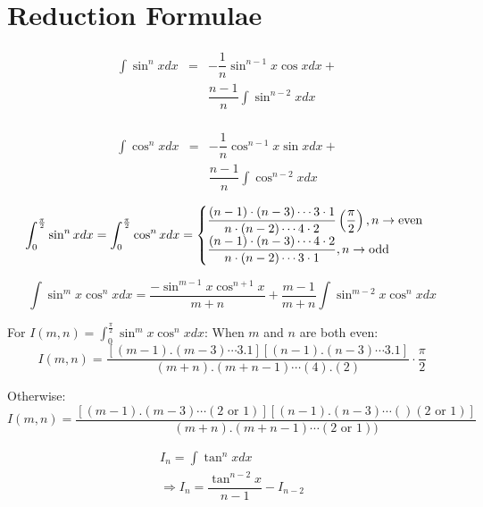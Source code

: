 \chapter{Reduction Formulae}
\begin{equation}
	\begin{aligned}
			\int \sin^n x dx &=&-\dfrac{1}{n}\sin^{n-1} x\cos x dx+&\\
			& &\dfrac{n-1}{n}\int \sin^{n-2} x dx\\
	\end{aligned}
\end{equation}

\begin{equation}
	\begin{aligned}
			\int \cos^n x dx&=&-\dfrac{1}{n}\cos^{n-1} x\sin x dx+&\\
			& &\dfrac{n-1}{n}\int \cos^{n-2} x dx\\
	\end{aligned}
\end{equation}
\begin{equation}
	\int_0^{\frac{\pi}{2}} \sin^n x dx=\int_0^{\frac{\pi}{2}} \cos^n x dx=\begin{cases}\dfrac{(n-1)\cdot(n-3)\cdots 3\cdot1}{n\cdot(n-2)\cdots 4\cdot 2}\left(\dfrac{\pi}{2}\right), n\rightarrow \text{even}\\
		\dfrac{(n-1)\cdot(n-3)\cdots 4\cdot2}{n\cdot(n-2)\cdots 3\cdot 1}, n\rightarrow \text{odd} \end{cases}\\
\end{equation}

\begin{equation}
	\int \sin^m x\cos^n x dx=\dfrac{-\sin^{m-1} x\cos^{n+1} x}{m+n}+\dfrac{m-1}{m+n}\int \sin^{m-2} x\cos^n x dx
\end{equation}

For $I(m,n)=\int_0^{\frac{\pi}{2}} \sin^m x\cos^n x dx$:
When $m$ and $n$ are both even:
\begin{equation}
	I(m,n)=\dfrac{[(m-1).(m-3)\cdots 3.1][(n-1).(n-3)\cdots 3.1]}{(m+n).(m+n-1)\cdots(4).(2)}\cdot\dfrac{\pi}{2}
\end{equation}

Otherwise:
\begin{equation}
	I(m,n)=\dfrac{[(m-1).(m-3)\cdots (2\text{ or }1)][(n-1).(n-3)\cdots ()(2\text{ or }1)]}{(m+n).(m+n-1)\cdots(2\text{ or }1))}
\end{equation}

\begin{align}
	I_n=\int \tan^n x dx\nonumber\\
	\Rightarrow I_n=\dfrac{\tan^{n-2} x}{n-1}-I_{n-2}
\end{align}

